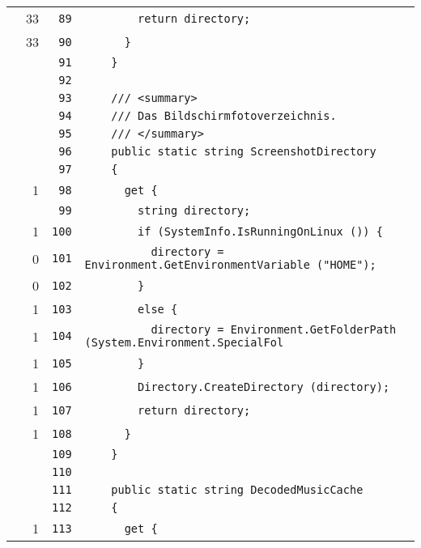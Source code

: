 \documentclass[a4paper,10pt]{article}
\begin{document}
\begin{longtable}[l]{lrrl}
\cellcolor{green} & 33 & \verb~89~ & \verb~        return directory;~\\
\cellcolor{green} & 33 & \verb~90~ & \verb~      }~\\
\cellcolor{gray} &  & \verb~91~ & \verb~    }~\\
\cellcolor{gray} &  & \verb~92~ & \verb~~\\
\cellcolor{gray} &  & \verb~93~ & \verb~    /// <summary>~\\
\cellcolor{gray} &  & \verb~94~ & \verb~    /// Das Bildschirmfotoverzeichnis.~\\
\cellcolor{gray} &  & \verb~95~ & \verb~    /// </summary>~\\
\cellcolor{gray} &  & \verb~96~ & \verb~    public static string ScreenshotDirectory~\\
\cellcolor{gray} &  & \verb~97~ & \verb~    {~\\
\cellcolor{green} & 1 & \verb~98~ & \verb~      get {~\\
\cellcolor{gray} &  & \verb~99~ & \verb~        string directory;~\\
\cellcolor{green} & 1 & \verb~100~ & \verb~        if (SystemInfo.IsRunningOnLinux ()) {~\\
\cellcolor{red} & 0 & \verb~101~ & \verb~          directory = Environment.GetEnvironmentVariable ("HOME");~\\
\cellcolor{red} & 0 & \verb~102~ & \verb~        }~\\
\cellcolor{green} & 1 & \verb~103~ & \verb~        else {~\\
\cellcolor{green} & 1 & \verb~104~ & \verb~          directory = Environment.GetFolderPath (System.Environment.SpecialFol~\\
\cellcolor{green} & 1 & \verb~105~ & \verb~        }~\\
\cellcolor{green} & 1 & \verb~106~ & \verb~        Directory.CreateDirectory (directory);~\\
\cellcolor{green} & 1 & \verb~107~ & \verb~        return directory;~\\
\cellcolor{green} & 1 & \verb~108~ & \verb~      }~\\
\cellcolor{gray} &  & \verb~109~ & \verb~    }~\\
\cellcolor{gray} &  & \verb~110~ & \verb~~\\
\cellcolor{gray} &  & \verb~111~ & \verb~    public static string DecodedMusicCache~\\
\cellcolor{gray} &  & \verb~112~ & \verb~    {~\\
\cellcolor{green} & 1 & \verb~113~ & \verb~      get {~\\

\end{longtable}
\end{document}
